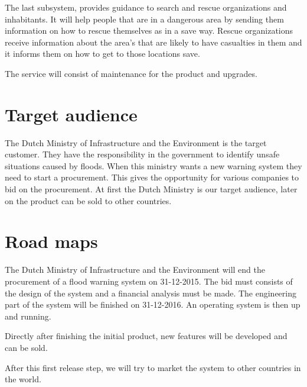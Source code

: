 The last subsystem, provides guidance to search and rescue organizations and inhabitants. It will help people that are in a dangerous area by sending them information on how to rescue themselves as in a save way. Rescue organizations  receive information about the area's that are likely to have casualties in them and it informs them on how to get to those locations save.

The service will consist of maintenance for the product and upgrades.

\section{Target audience}
The Dutch Ministry of Infrastructure and the Environment is the target customer. They have the responsibility in the government to identify unsafe situations caused by floods. When this ministry wants a new warning system they need to start a procurement. This gives the opportunity for various companies to bid on the procurement. At first the Dutch Ministry is our target audience, later on the product can be sold to other countries.


\section{Road maps}
The Dutch Ministry of Infrastructure and the Environment will end the procurement of a flood warning system on 31-12-2015. The bid must consists of the design of the system and a financial analysis must be made. The engineering part of the system will be finished on 31-12-2016. An operating system is then up and running.

Directly after finishing the initial product, new features will be developed and can be sold.

After this first release step, we will try to market the system to other countries in the world. 

